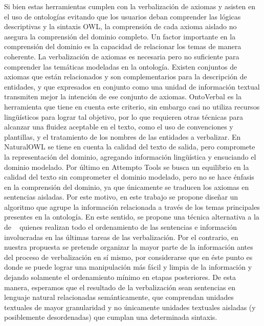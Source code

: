 Si bien estas herramientas cumplen con la verbalización de axiomas y asisten en el uso de ontologías evitando que los usuarios deban comprender las lógicas descriptivas y la sintaxis OWL, la comprensión de cada axioma aislado no asegura la comprensión del dominio completo. Un factor importante en la comprensión del dominio es la capacidad de relacionar los temas de manera coherente. La verbalización de axiomas es necesaria pero no suficiente para comprender las temáticas modeladas en la ontología. Existen conjuntos de axiomas que están relacionados y son complementarios para la descripción de entidades, y que expresados en conjunto como una unidad de información textual transmiten mejor la intención de ese conjunto de axiomas. OntoVerbal es la herramienta que tiene en cuenta este criterio, sin embargo casi no utiliza recursos lingüísticos para lograr tal objetivo, por lo que requieren otras técnicas para alcanzar una fluidez aceptable en el texto, como el uso de convenciones y plantillas, y el tratamiento de los nombres de las entidades a verbalizar. %
En NaturalOWL se tiene en cuenta la calidad del texto de salida, pero compromete la representación del dominio, agregando información lingüística y ensuciando el dominio modelado. Por último en Attempto Tools se busca un equilibrio en la calidad del texto sin comprometer el dominio modelado, pero no se hace énfasis en la comprensión del dominio, ya que únicamente se traducen los axiomas en sentencias aisladas. Por este motivo, en este trabajo se propone diseñar un algoritmo que agrupe la información relacionada a través de los temas principales presentes en la ontología. En este sentido, se propone una técnica alternativa a la de ~\cite{reiter1997building} quienes realizan todo el ordenamiento de las sentencias e información involucradas en las últimas tareas de las verbalización. Por el contrario, en nuestra propuesta se pretende organizar la mayor parte de la información antes del proceso de verbalización en sí mismo, por considerarse que en éste punto es donde se puede lograr una manipulación más fácil y limpia de la información y dejando solamente el ordenamiento mínimo en etapas posteriores. De esta manera, esperamos que el resultado de la verbalización sean sentencias en lenguaje natural relacionadas semánticamente, que comprendan unidades textuales de mayor granularidad y no únicamente unidades textuales aisladas (y posiblemente desordenadas) que cumplan una determinada sintaxis.

